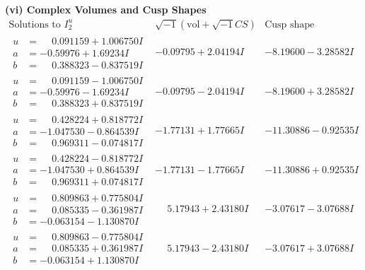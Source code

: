 \documentclass[1p]{elsarticle_modified}
\theoremstyle{definition}
\newcommand{\I}{\sqrt{-1}}
\begin{document}
\newpage\flushleft \textbf{(vi) Complex Volumes and Cusp Shapes}
$$\begin{array}{c|c|c}  
\text{Solutions to }I^u_{2}& \I (\text{vol} + \sqrt{-1}CS) & \text{Cusp shape}\\
 \hline 
\begin{aligned}
u &= \phantom{-}0.091159 + 1.006750 I \\
a &= -0.59976 + 1.69234 I \\
b &= \phantom{-}0.388323 - 0.837519 I\end{aligned}
 & -0.09795 + 2.04194 I & -8.19600 - 3.28582 I \\ \hline\begin{aligned}
u &= \phantom{-}0.091159 - 1.006750 I \\
a &= -0.59976 - 1.69234 I \\
b &= \phantom{-}0.388323 + 0.837519 I\end{aligned}
 & -0.09795 - 2.04194 I & -8.19600 + 3.28582 I \\ \hline\begin{aligned}
u &= \phantom{-}0.428224 + 0.818772 I \\
a &= -1.047530 - 0.864539 I \\
b &= \phantom{-}0.969311 - 0.074817 I\end{aligned}
 & -1.77131 + 1.77665 I & -11.30886 - 0.92535 I \\ \hline\begin{aligned}
u &= \phantom{-}0.428224 - 0.818772 I \\
a &= -1.047530 + 0.864539 I \\
b &= \phantom{-}0.969311 + 0.074817 I\end{aligned}
 & -1.77131 - 1.77665 I & -11.30886 + 0.92535 I \\ \hline\begin{aligned}
u &= \phantom{-}0.809863 + 0.775804 I \\
a &= \phantom{-}0.085335 - 0.361987 I \\
b &= -0.063154 - 1.130870 I\end{aligned}
 & \phantom{-}5.17943 + 2.43180 I & -3.07617 - 3.07688 I \\ \hline\begin{aligned}
u &= \phantom{-}0.809863 - 0.775804 I \\
a &= \phantom{-}0.085335 + 0.361987 I \\
b &= -0.063154 + 1.130870 I\end{aligned}
 & \phantom{-}5.17943 - 2.43180 I & -3.07617 + 3.07688 I \\ \hline\begin{aligned}

\end{aligned}
\end{array}$$
\end{document}

